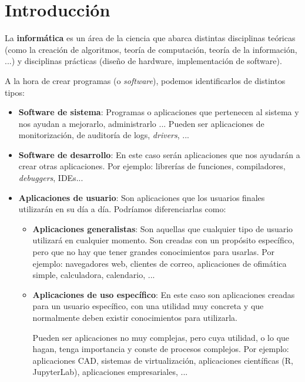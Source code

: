 \chapter{Introducción}

La \textbf{informática} es un área de la ciencia que abarca distintas disciplinas teóricas (como la creación de algoritmos, teoría de computación, teoría de la información, ...) y disciplinas prácticas (diseño de hardware, implementación de software).

A la hora de crear programas (o \textit{software}), podemos identificarlos de distintos tipos:
\begin{itemize}
    \item \textbf{Software de sistema}: Programas o aplicaciones que pertenecen al sistema y nos ayudan a mejorarlo, administrarlo ... Pueden ser aplicaciones de monitorización, de auditoría de logs, \textit{drivers}, ...

    \item \textbf{Software de desarrollo}: En este caso serán aplicaciones que nos ayudarán a crear otras aplicaciones. Por ejemplo: librerías de funciones, compiladores, \textit{debuggers}, IDEs...

    \item \textbf{Aplicaciones de usuario}: Son aplicaciones que los usuarios finales utilizarán en su día a día. Podríamos diferenciarlas como:
    \begin{itemize}
        \item \textbf{Aplicaciones generalistas}: Son aquellas que cualquier tipo de usuario utilizará en cualquier momento. Son creadas con un propósito específico, pero que no hay que tener grandes conocimientos para usarlas. Por ejemplo: navegadores web, clientes de correo, aplicaciones de ofimática simple, calculadora, calendario, ...

        \item \textbf{Aplicaciones de uso específico}: En este caso son aplicaciones creadas para un usuario específico, con una utilidad muy concreta y que normalmente deben existir conocimientos para utilizarla.

        Pueden ser aplicaciones no muy complejas, pero cuya utilidad, o lo que hagan, tenga importancia y conste de procesos complejos. Por ejemplo: aplicaciones CAD, sistemas de virtualización, aplicaciones científicas (R, JupyterLab), aplicaciones empresariales, ...
    \end{itemize}
\end{itemize}

